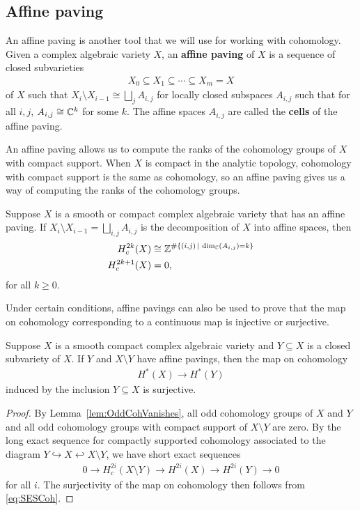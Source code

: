 \documentclass[12pt]{amsart}
\newcommand{\st}{\,|\,}
\begin{document}
\subsection{Affine paving}

An affine paving is another tool that we will use for working with cohomology. Given a complex algebraic variety $X$, an {\bf affine paving} of $X$ is a sequence of closed subvarieties
\begin{align}
    X_0 \subseteq X_1\subseteq \cdots \subseteq X_m = X
\end{align}
of $X$ such that $X_i\setminus X_{i-1} \cong \bigsqcup_j A_{i,j}$ for locally closed subspaces $A_{i,j}$ such that for all $i,j$, $A_{i,j}\cong \mathbb{C}^k$ for some $k$. The affine spaces $A_{i,j}$ are called the {\bf cells} of the affine paving.

An affine paving allows us to compute the ranks of the cohomology groups of $X$ with compact support. When $X$ is compact in the analytic topology, cohomology with compact support is the same as cohomology, so an affine paving gives us a way of computing the ranks of the cohomology groups.

\begin{lemma}\label{lem:OddCohVanishes}
Suppose $X$ is a smooth or compact complex algebraic variety that has an affine paving. If $X_i\setminus X_{i-1} = \bigsqcup_{i,j} A_{i,j}$ is the decomposition of $X$ into affine spaces, then
\begin{align}
    H^{2k}_c(X) &\cong \bZ^{\#\{(i,j) \st \dim_\bC(A_{i,j}) = k\}}\\
    H^{2k+1}_c(X) & = 0,
\end{align}
for all $k\geq 0$.
\end{lemma}

Under certain conditions, affine pavings can also be used to prove that the map on cohomology corresponding to a continuous map is injective or surjective.
%
\begin{lemma}\label{lem:PavingSurj}
Suppose $X$ is a smooth compact complex algebraic variety and $Y\subseteq X$ is a closed subvariety of $X$. If $Y$ and $X\setminus Y$ have affine pavings, then the map on cohomology
\begin{align}
H^*(X)\to H^*(Y)
\end{align}
induced by the inclusion $Y\subseteq X$
is surjective.
\end{lemma}
\begin{proof}
By Lemma~\ref{lem:OddCohVanishes}, all odd cohomology groups of $X$ and $Y$ and all odd cohomology groups with compact support of $X\setminus Y$ are zero. By the long exact sequence for compactly supported cohomology associated to the diagram $Y\hookrightarrow X\hookleftarrow X\setminus Y$, we have short exact sequences
\begin{align}\label{eq:SESCoh}
0 \to H^{2i}_c(X\setminus Y) \to H^{2i}(X) \to H^{2i}(Y)\to 0
\end{align}
for all $i$.
The surjectivity of the map on cohomology then follows from \eqref{eq:SESCoh}.
\end{proof}
\end{document}

